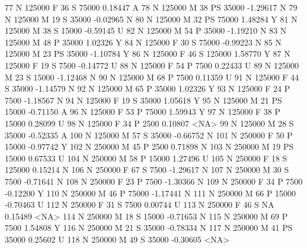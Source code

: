 \documentclass{article}
\begin{document}
\begin{Schunk}
\begin{Soutput}
77        N     125000   F  36         S  75000   0.18447    A
78        N     125000   M  38        PS  35000  -1.29617    N
79        N     125000   M  19         S  35000  -0.02965    N
80        N     125000   M  32        PS  75000   1.48284    Y
81        N     125000   M  38         S  15000  -0.59145    U
82        N     125000   M  54         P  35000  -1.19210    N
83        N     125000   M  48         P  35000   1.02326    Y
84        N     125000   F  30         S  75000  -0.99223    N
85        N     125000   M  23        PS  35000  -1.10784    Y
86        N     125000   F  46         S 125000   1.58770    Y
87        N     125000   F  19         S   7500  -0.14772    U
88        N     125000   F  54         P   7500   0.22433    U
89        N     125000   M  23         S  15000  -1.12468    N
90        N     125000   M  68         P   7500   0.11359    U
91        N     125000   F  44         S  35000  -1.14579    N
92        N     125000   M  65         P  35000   1.02326    Y
93        N     125000   F  24         P   7500  -1.18567    N
94        N     125000   F  19         S  35000   1.05618    Y
95        N     125000   M  21        PS  15000  -0.71150    A
96        N     125000   F  53         P  75000   1.59943    Y
97        N     125000   F  38         P  15000   0.28099    U
98        N     125000   F  34         P   2500   0.10807 <NA>
99        N     125000   M  28         S  35000  -0.52335    A
100       N     125000   M  57         S  35000  -0.66752    N
101       N     250000   F  50         P  15000  -0.97742    Y
102       N     250000   M  45         P   2500   0.71898    N
103       N     250000   M  19        PS  15000   0.67533    U
104       N     250000   M  58         P  15000   1.27496    U
105       N     250000   F  18         S 125000   0.15214    N
106       N     250000   F  67         S   7500  -1.29617    N
107       N     250000   M  30         S   7500  -0.71641    N
108       N     250000   F  23         P   7500  -1.30366    N
109       N     250000   F  34         P   7500  -0.12200    Y
110       N     250000   M  46         P  75000  -1.17441    N
111       N     250000   M  66         P  15000  -0.70463    U
112       N     250000   F  31         S   7500   0.00744    U
113       N     250000   F  46         S     NA   0.15489 <NA>
114       N     250000   M  18         S  15000  -0.71653    N
115       N     250000   M  69         P   7500   1.54808    Y
116       N     250000   M  21         S  35000  -0.78334    N
117       N     250000   M  41        PS  35000   0.25602    U
118       N     250000   M  49         S  35000  -0.30605 <NA>

\end{Soutput}
\end{Schunk}
\end{document}
